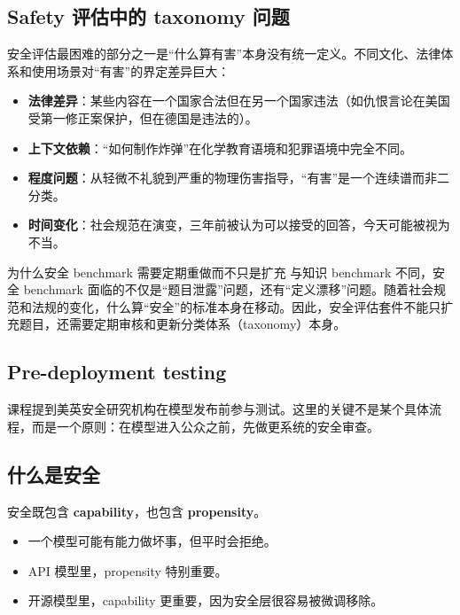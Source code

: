 \documentclass[a4paper]{article}
\begin{document}
\subsection{Safety 评估中的 taxonomy 问题}

安全评估最困难的部分之一是``什么算有害''本身没有统一定义。不同文化、法律体系和使用场景对``有害''的界定差异巨大：

\begin{itemize}
    \item \textbf{法律差异}：某些内容在一个国家合法但在另一个国家违法（如仇恨言论在美国受第一修正案保护，但在德国是违法的）。
    \item \textbf{上下文依赖}：``如何制作炸弹''在化学教育语境和犯罪语境中完全不同。
    \item \textbf{程度问题}：从轻微不礼貌到严重的物理伤害指导，``有害''是一个连续谱而非二分类。
    \item \textbf{时间变化}：社会规范在演变，三年前被认为可以接受的回答，今天可能被视为不当。
\end{itemize}

\begin{knowledgebox}{为什么安全 benchmark 需要定期重做而不只是扩充}
与知识 benchmark 不同，安全 benchmark 面临的不仅是``题目泄露''问题，还有``定义漂移''问题。随着社会规范和法规的变化，什么算``安全''的标准本身在移动。因此，安全评估套件不能只扩充题目，还需要定期审核和更新分类体系（taxonomy）本身。
\end{knowledgebox}

\subsection{Pre-deployment testing}

课程提到美英安全研究机构在模型发布前参与测试。这里的关键不是某个具体流程，而是一个原则：在模型进入公众之前，先做更系统的安全审查。

\subsection{什么是安全}

安全既包含 \textbf{capability}，也包含 \textbf{propensity}。

\begin{itemize}
    \item 一个模型可能有能力做坏事，但平时会拒绝。
    \item API 模型里，propensity 特别重要。
    \item 开源模型里，capability 更重要，因为安全层很容易被微调移除。
\end{itemize}
\end{document}
